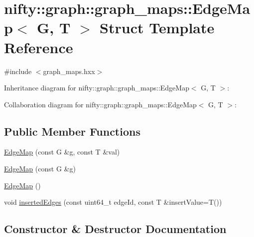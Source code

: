 \hypertarget{structnifty_1_1graph_1_1graph__maps_1_1EdgeMap}{}\section{nifty\+:\+:graph\+:\+:graph\+\_\+maps\+:\+:Edge\+Map$<$ G, T $>$ Struct Template Reference}
\label{structnifty_1_1graph_1_1graph__maps_1_1EdgeMap}


{\ttfamily \#include $<$graph\+\_\+maps.\+hxx$>$}



Inheritance diagram for nifty\+:\+:graph\+:\+:graph\+\_\+maps\+:\+:Edge\+Map$<$ G, T $>$\+:


Collaboration diagram for nifty\+:\+:graph\+:\+:graph\+\_\+maps\+:\+:Edge\+Map$<$ G, T $>$\+:
\subsection*{Public Member Functions}
\begin{DoxyCompactItemize}
\item 
\hyperlink{structnifty_1_1graph_1_1graph__maps_1_1EdgeMap_a76af091031717407e07ffb154f74e653}{Edge\+Map} (const G \&g, const T \&val)
\item 
\hyperlink{structnifty_1_1graph_1_1graph__maps_1_1EdgeMap_a5100202d40822e8cf98aea0ee90ee01e}{Edge\+Map} (const G \&g)
\item 
\hyperlink{structnifty_1_1graph_1_1graph__maps_1_1EdgeMap_adfef359098c94982e5a8f6355d068878}{Edge\+Map} ()
\item 
void \hyperlink{structnifty_1_1graph_1_1graph__maps_1_1EdgeMap_aa658ff2e5952fce8342349a159425bbd}{inserted\+Edges} (const uint64\+\_\+t edge\+Id, const T \&insert\+Value=T())
\end{DoxyCompactItemize}


\subsection{Constructor \& Destructor Documentation}
\hypertarget{structnifty_1_1graph_1_1graph__maps_1_1EdgeMap_a76af091031717407e07ffb154f74e653}{}
